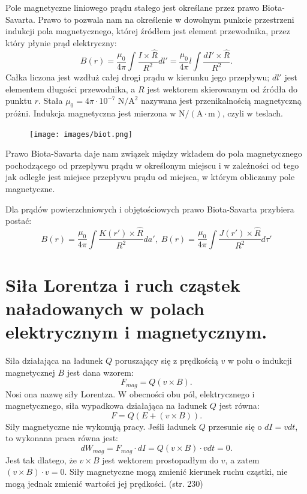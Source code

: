 \documentclass{article}
\begin{document}
Pole magnetyczne liniowego prądu stałego jest określane przez prawo Biota-Savarta. Prawo to pozwala nam na określenie w dowolnym punkcie przestrzeni indukcji pola magnetycznego, której źródłem jest element przewodnika, przez który płynie prąd elektryczny:
\begin{equation*}
    B(r) = \frac{\mu_0}{4\pi}\int \frac{I\times \hat{R}}{R^2}dl' = \frac{\mu_0}{4\pi}l\int\frac{dI'\times \hat{R}}{R^2}.
\end{equation*}
Całka liczona jest wzdłuż całej drogi prądu w kierunku jego przepływu; $dl'$ jest elementem długości przewodnika, a $R$ jest wektorem skierowanym od źródła do punktu $r$. Stała $\mu_0=4\pi \cdot 10^{-7}\; \mathrm{N/A^2}$ nazywana jest przenikalnością magnetyczną próżni. Indukcja magnetyczna jest mierzona w $\mathrm{N/(A\cdot m)}$, czyli w teslach. 

\begin{figure}[H]
    \centering
\texttt{[image: images/biot.png]}
\end{figure}

Prawo Biota-Savarta daje nam związek między wkładem do pola magnetycznego pochodzącego od przepływu prądu w określonym miejscu i w zależności od tego jak odległe jest miejsce przepływu prądu od miejsca, w którym obliczamy pole magnetyczne.

Dla prądów powierzchniowych i objętościowych prawo Biota-Savarta przybiera postać:
\begin{equation*}
    B(r) = \frac{\mu_0}{4\pi}\int \frac{K(r')\times \hat{R}}{R^2}da', \; B(r) = \frac{\mu_0}{4\pi}\int \frac{J(r')\times \hat{R}}{R^2}d\tau'
\end{equation*}

\section{Siła Lorentza i ruch cząstek naładowanych w polach elektrycznym i magnetycznym.}

Siła działająca na ładunek $Q$ poruszający się z prędkością $v$ w polu o indukcji magnetycznej $B$ jest dana wzorem:
\begin{equation*}
    F_{mag}=Q(v\times B).
\end{equation*}
Nosi ona nazwę siły Lorentza. W obecności obu pól, elektrycznego i magnetycznego, siła wypadkowa działająca na ładunek $Q$ jest równa:
\begin{equation*}
    F=Q(E+(v\times B)).
\end{equation*} 
Siły magnetyczne nie wykonują pracy. Jeśli ładunek $Q$ przesunie się o $dI=vdt$, to wykonana praca równa jest:
\begin{equation*}
    dW_{mag}=F_{mag}\cdot dI=Q(v\times B)\cdot vdt=0.
\end{equation*}
Jest tak dlatego, że $v\times B$ jest wektorem prostopadłym do $v$, a zatem $(v\times B)\cdot v=0$. Siły magnetyczne mogą zmienić kierunek ruchu cząstki, nie mogą jednak zmienić wartości jej prędkości.  (str. 230)
\end{document}
